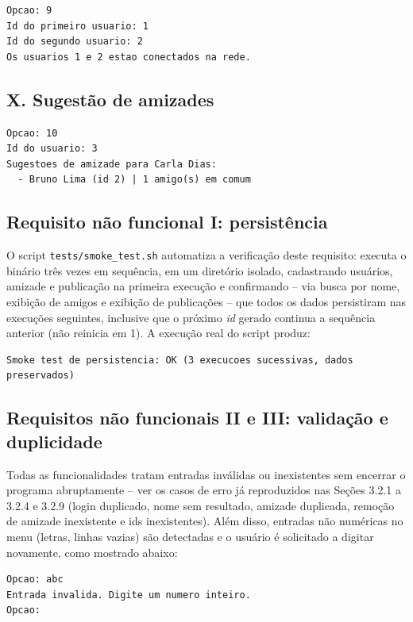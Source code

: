 \documentclass[
	12pt,				%
	oneside,			%
	a4paper,			%
	chapter=TITLE,		%
	brazil,				%
	]{abntex2}
\begin{document}
\begin{lstlisting}
Opcao: 9
Id do primeiro usuario: 1
Id do segundo usuario: 2
Os usuarios 1 e 2 estao conectados na rede.
\end{lstlisting}

\subsection{X. Sugestão de amizades}

\begin{lstlisting}
Opcao: 10
Id do usuario: 3
Sugestoes de amizade para Carla Dias:
  - Bruno Lima (id 2) | 1 amigo(s) em comum
\end{lstlisting}

\subsection{Requisito não funcional I: persistência}

O script \texttt{tests/\allowbreak smoke\_test.sh} automatiza a verificação deste
requisito: executa o binário três vezes em sequência, em um diretório
isolado, cadastrando usuários, amizade e publicação na primeira execução e
confirmando -- via busca por nome, exibição de amigos e exibição de
publicações -- que todos os dados persistiram nas execuções seguintes,
inclusive que o próximo \emph{id} gerado continua a sequência anterior (não
reinicia em 1). A execução real do script produz:

\begin{lstlisting}
Smoke test de persistencia: OK (3 execucoes sucessivas, dados preservados)
\end{lstlisting}

\subsection{Requisitos não funcionais II e III: validação e duplicidade}

Todas as funcionalidades tratam entradas inválidas ou inexistentes sem
encerrar o programa abruptamente -- ver os casos de erro já reproduzidos
nas Seções 3.2.1 a 3.2.4 e 3.2.9 (login duplicado, nome sem resultado,
amizade duplicada, remoção de amizade inexistente e ids inexistentes). Além
disso, entradas não numéricas no menu (letras, linhas vazias) são
detectadas e o usuário é solicitado a digitar novamente, como mostrado
abaixo:

\begin{lstlisting}
Opcao: abc
Entrada invalida. Digite um numero inteiro.
Opcao:
\end{lstlisting}
\end{document}
